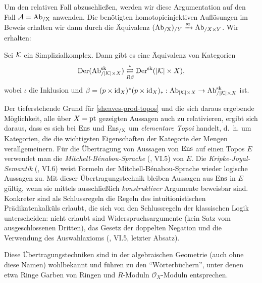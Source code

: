Um den relativen Fall abzuschließen, werden wir diese Argumentation
auf den Fall $\mathcal{A} = \operatorname{Ab_{/X}}$ anwenden. Die benötigten
homotopieinjektiven Auflösungen im Beweis erhalten wir dann durch die
Äquivalenz $(\operatorname{Ab_{/X}})_{/Y} \xrightarrow{\approx} \operatorname{Ab}_{/X \times Y}$. Wir erhalten:
\begin{theorem} \label{dersk-eq-rel}
  Sei $\mathcal{K}$ ein Simplizialkomplex. Dann gibt es eine Äquivalenz von
  Kategorien
  \[ \operatorname{Der}(\operatorname{Ab}^{\operatorname{sk}}_{/|\mathcal{K}| \times X})
     \mathrel{\mathop{\rightleftarrows}^{\iota}_{R \beta}}
     \operatorname{Der}^{\operatorname{sk}}(|\mathcal{K}| \times X),
  \]
  wobei $\iota$ die Inklusion und $\beta = (p \times \operatorname{id}_X)^* (p
  \times \operatorname{id}_X)_*: \operatorname{Ab}_{|\mathcal{K}| \times X} \to \operatorname{Ab}^{\operatorname{sk}}_{/|\mathcal{K}| \times X}$
  ist.
\end{theorem}
\begin{bem}
  Der tieferstehende Grund für \ref{sheaves-prod-topos} und die sich
  daraus ergebende Möglichkeit, alle über $X = \operatorname{pt}$ gezeigten
  Aussagen auch zu relativieren, ergibt sich daraus, dass es sich bei
  $\operatorname{Ens}$ und $\operatorname{Ens_{/X}}$ um \emph{elementare Topoi} handelt, d.~h. um
  Kategorien, die die wichtigsten Eigenschaften der Kategorie der
  Mengen verallgemeinern. Für die Übertragung von Aussagen von $\operatorname{Ens}$
  auf einen Topos $E$ verwendet man die
  \emph{Mitchell-Bénabou-Sprache} (\cite{MoerTopoi}, VI.5) von
  $E$. Die \emph{Kripke-Joyal-Semantik} (\cite{MoerTopoi}, VI.6) weist
  Formeln der Mitchell-Bénabou-Sprache wieder logische Aussagen
  zu. Mit dieser Übertragungstechnik bleiben Aussagen aus $\operatorname{Ens}$ in
  $E$ gültig, wenn sie mittels ausschließlich \emph{konstruktiver}
  Argumente beweisbar sind. Konkreter sind als Schlussregeln die
  Regeln des intuitionistischen Prädikatenkalküls erlaubt, die sich
  von den Schlussregeln der klassischen Logik unterscheiden: nicht
  erlaubt sind Widerspruchsargumente (kein Satz vom ausgeschlossenen
  Dritten), das Gesetz der doppelten Negation und die Verwendung des
  Auswahlaxioms (\cite{MoerTopoi}, VI.5, letzter Absatz).

  Diese Übertragungstechniken sind in der algebraischen Geometrie
  (auch ohne diese Namen) wohlbekannt und führen zu den
  ``Wörterbüchern'', unter denen etwa Ringe Garben von Ringen und
  $R$-Moduln $\mathcal{O}_X$-Moduln entsprechen.
\end{bem}
